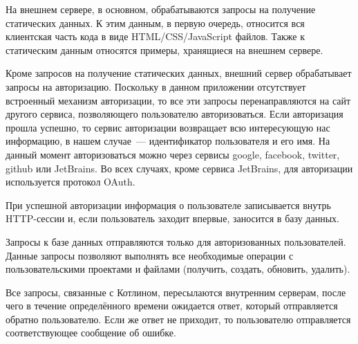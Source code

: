 	На внешнем сервере, в основном, обрабатываются запросы на получение статических данных. К этим данным, в первую очередь, относится вся клиентская часть кода в виде HTML/CSS/JavaScript файлов. Также к статическим данным относятся примеры, хранящиеся на внешнем сервере.
	
	Кроме запросов на получение статических данных, внешний сервер обрабатывает запросы на авторизацию. Поскольку в данном приложении отсутствует встроенный механизм авторизации, то все эти запросы перенаправляются на сайт другого сервиса, позволяющего пользователю авторизоваться. Если авторизация прошла успешно, то сервис авторизации возвращает всю интересующую нас информацию, в нашем случае~--- идентификатор пользователя и его имя. На данный момент авторизоваться можно через сервисы google, facebook, twitter, github или JetBrains. Во всех случаях, кроме сервиса JetBrains, для авторизации используется протокол OAuth.
	
	
	При успешной авторизации информация о пользователе записывается внутрь HTTP-сессии и, если пользователь заходит впервые, заносится в базу данных.
	
	
	Запросы к базе данных отправляются только для авторизованных пользователей. Данные запросы позволяют выполнять все необходимые операции с пользовательскими проектами и файлами (получить, создать, обновить, удалить).
	
	Все запросы, связанные с Котлином, пересылаются внутренним серверам, после чего в течение определённого времени ожидается ответ, который отправляется обратно пользователю. Если же ответ не приходит, то пользователю отправляется соответствующее сообщение об ошибке.
	
	

